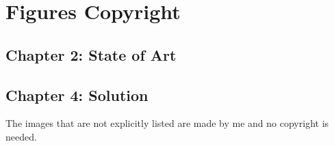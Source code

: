 %
%
\chapter{Figures Copyright}
%
\label{cap:figurescopyright}
%
%
\section*{Chapter 2: State of Art}



\section*{Chapter 4: Solution}


%

The images that are not explicitly listed are made by me and no copyright is needed.
 
